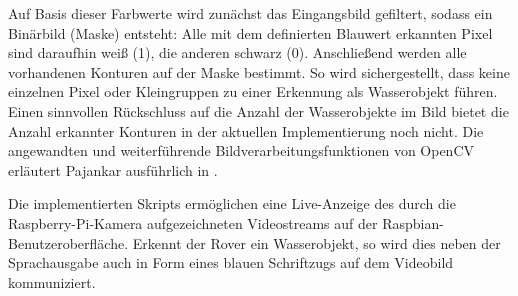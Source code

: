 Auf Basis dieser Farbwerte wird zunächst das Eingangsbild gefiltert, sodass ein Binärbild (Maske) entsteht:
Alle mit dem definierten Blauwert erkannten Pixel sind daraufhin weiß (1), die anderen schwarz (0).
Anschließend werden alle vorhandenen Konturen auf der Maske bestimmt.
So wird sichergestellt, dass keine einzelnen Pixel oder Kleingruppen zu einer Erkennung als Wasserobjekt führen.
Einen sinnvollen Rückschluss auf die Anzahl der Wasserobjekte im Bild bietet die Anzahl erkannter Konturen in der aktuellen Implementierung noch nicht.
Die angewandten und weiterführende Bildverarbeitungsfunktionen von OpenCV erläutert Pajankar ausführlich in \cite{pajankar2015}.

Die implementierten Skripts ermöglichen eine Live-Anzeige des durch die Raspberry-Pi-Kamera aufgezeichneten Videostreams auf der Raspbian-Benutzeroberfläche.
Erkennt der Rover ein Wasserobjekt, so wird dies neben der Sprachausgabe auch in Form eines blauen Schriftzugs auf dem Videobild kommuniziert.